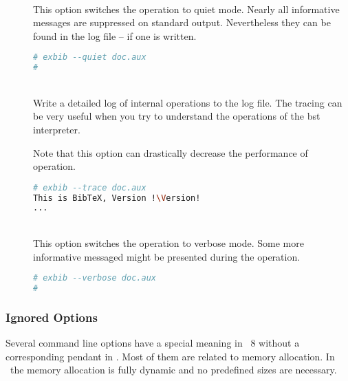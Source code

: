 \begin{description}
\item[]
\item[]
\item[]\ \\
  This option switches the operation to quiet mode. Nearly all
  informative messages are suppressed on standard output.
  Nevertheless they can be found in the log file -- if one is written.
\begin{lstlisting}[language=sh]
# exbib --quiet doc.aux
#
\end{lstlisting}

\item[]
\item[]\ \\
  Write a detailed log of internal operations to the log file.  The
  tracing can be very useful when you try to understand the operations
  of the bst interpreter.
  
  Note that this option can drastically decrease the performance of
  operation.
\begin{lstlisting}[language=sh,escapechar=!]
# exbib --trace doc.aux
This is BibTeX, Version !\Version!
...
\end{lstlisting}

\item[]
\item[]\ \\
  This option switches the operation to verbose mode. Some more
  informative messaged might be presented during the operation.
\begin{lstlisting}[language=sh]
# exbib --verbose doc.aux
#
\end{lstlisting}
\end{description}


\subsubsection{Ignored Options}

 Several command line options have a special meaning in
\BibTeX~8 without a corresponding pendant in \ExBib. Most of them are
related to memory allocation. In \ExBib\ the memory allocation is
fully dynamic and no predefined sizes are necessary.

